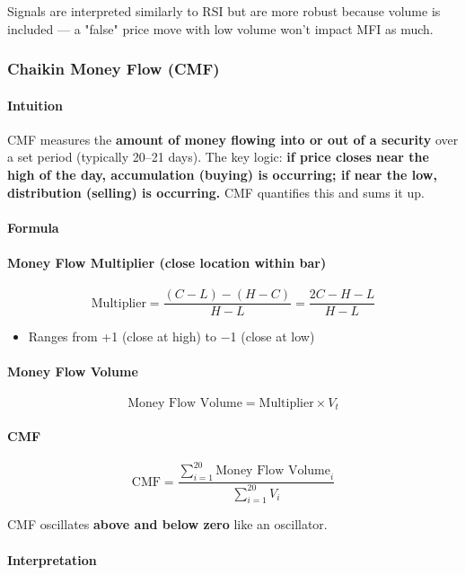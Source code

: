 \documentclass[12pt,openany]{book}
\begin{document}
Signals are interpreted similarly to RSI but are more robust because volume is included --- a "false" price move with low volume won't impact MFI as much.

\subsubsection{Chaikin Money Flow (CMF)}

\paragraph{Intuition}
CMF measures the \textbf{amount of money flowing into or out of a security} over a set period (typically 20--21 days). The key logic: \textbf{if price closes near the high of the day, accumulation (buying) is occurring; if near the low, distribution (selling) is occurring.} CMF quantifies this and sums it up.

\paragraph{Formula}

\paragraph{Money Flow Multiplier (close location within bar)}
\[
\text{Multiplier} = \frac{(C - L) - (H - C)}{H - L} = \frac{2C - H - L}{H - L}
\]

\begin{itemize}[leftmargin=*]
    \item Ranges from +1 (close at high) to \(-\)1 (close at low)
\end{itemize}

\paragraph{Money Flow Volume}
\[
\text{Money Flow Volume} = \text{Multiplier} \times V_t
\]

\paragraph{CMF}
\[
\text{CMF} = \frac{\sum_{i=1}^{20} \text{Money Flow Volume}_i}{\sum_{i=1}^{20} V_i}
\]

CMF oscillates \textbf{above and below zero} like an oscillator.

\paragraph{Interpretation}
\end{document}
